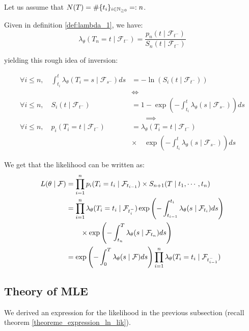 \documentclass[11pt]{book}
\newcommand{\sequence}[1]{\{ #1 \}_{ i \in \N} }
\begin{document}
\begin{demo}{}{}
Let us assume that $N(T) = \# \sequence{ t_i } =: n$.

Given in definition \ref{def:lambda_1}, we have:
$$\lambda_{\theta}( T_n = t \mid \mathcal F_{t^-} ) = \frac{ p_n( t \mid \mathcal F_{t^-} )}{S_n( t \mid \mathcal F_{t^-} )}$$


yielding  this rough idea of inversion:

\begin{align*}
\forall i \leq n, \quad \int_{t_i}^t \lambda_{\theta}( T_i = s \mid \mathcal F_{s^-} ) ds &= - \ln ( S_i (t \mid \mathcal F_{t^-} ))  \\
& \iff \\
\forall i \leq n, \quad  S_i( t \mid \mathcal F_{t^-} ) & = 1 -  \exp \left ( - \int_{t_i}^t \lambda_{\theta} ( s \mid \mathcal F_{s^-} ) \right ) ds \\
& \qquad \implies  \\
\forall i \leq n, \quad  p_i( T_i = t \mid \mathcal F_{t^-} ) & = \lambda_{\theta} ( T_i = t \mid \mathcal F_{t^-} ) \\
& \times \quad \exp \left ( - \int_{t_i}^t \lambda_{\theta} ( s \mid \mathcal F_{s^-} ) \right ) ds 
\end{align*} 


We get that the likelihood can be written as:
\begin{align}
L( \theta \mid \mathcal F ) &= \prod_{i=1}^n p_i( T_i = t_i \mid \mathcal F_{t_{i-1}} ) \times S_{n+1} ( T \mid t_1, \cdots, t_n ) \notag \\
&=  \prod_{i=1}^n  \lambda_{\theta} ( T_i = t_i \mid \mathcal F_{t_i^-} ) \exp \left ( - \int_{t_{i-1}}^{t_{i}} \lambda_{\theta} ( s \mid \mathcal F_{t_i} ) ds \right ) \notag \\
 & \qquad \times \exp \left ( - \int_{t_n}^T \lambda_{\theta} ( s \mid \mathcal F_{t_n} ) ds \right ) \notag \\
&=  \exp \left ( - \int_{0}^{T} \lambda_{\theta} ( s \mid \mathcal F ) ds \right )  \prod_{i=1}^n  \lambda_{\theta} ( T_i = t_i \mid \mathcal F_{t_{i-1}^-} )   
\end{align}
\end{demo}{}{}













\subsection{Theory of MLE}
We derived an expression for the likelihood in the previous subsection (recall theorem \ref{theoreme_expression_ln_lik}). 
\end{document}
